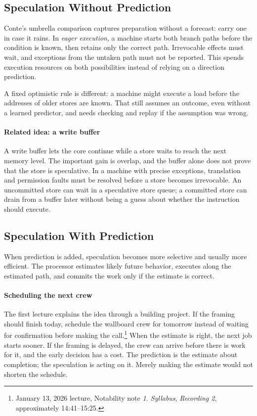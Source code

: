\subsection{Speculation Without Prediction}\label{subsec:auto-001}
Conte's umbrella comparison captures preparation without a forecast: carry one in case it rains.
In \textit{eager execution}, a machine starts both branch paths before the condition is known, then retains only the correct path.
Irrevocable effects must wait, and exceptions from the untaken path must not be reported.
This spends execution resources on both possibilities instead of relying on a direction prediction.

A fixed optimistic rule is different: a machine might execute a load before the addresses of older stores are known.
That still assumes an outcome, even without a learned predictor, and needs checking and replay if the assumption was wrong.

\paragraph{Related idea: a write buffer}\label{par:auto-006}
A write buffer lets the core continue while a store waits to reach the next memory level.
The important gain is overlap, and the buffer alone does not prove that the store is speculative.
In a machine with precise exceptions, translation and permission faults must be resolved before a store becomes irrevocable.
An uncommitted store can wait in a speculative store queue; a committed store can drain from a buffer later without being a guess about whether the instruction should execute.

\subsection{Speculation With Prediction}\label{subsec:auto-002}
When prediction is added, speculation becomes more selective and usually more efficient.
The processor estimates likely future behavior, executes along the estimated path, and commits the work only if the estimate is correct.

\paragraph{Scheduling the next crew}
The first lecture explains the idea through a building project.
If the framing should finish today, schedule the wallboard crew for tomorrow instead of waiting for confirmation before making the call.\footnote{January 13, 2026 lecture, Notability note \emph{1. Syllabus}, \emph{Recording 2}, approximately 14:41--15:25.}
When the estimate is right, the next job starts sooner.
If the framing is delayed, the crew can arrive before there is work for it, and the early decision has a cost.
The prediction is the estimate about completion; the speculation is acting on it.
Merely making the estimate would not shorten the schedule.

